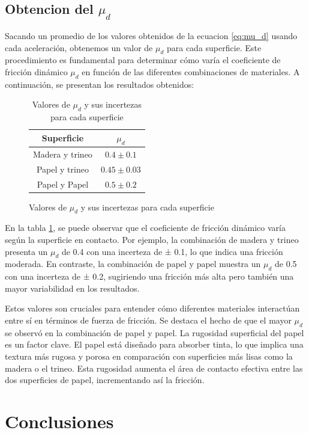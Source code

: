 \documentclass[12pt,a4]{article}
\begin{document}
\subsection{Obtencion del $\mu_d$}

Sacando un promedio de los valores obtenidos de la ecuacion \ref{eq:mu_d} usando cada aceleración, obtenemos un valor de $\mu_d$ para cada superficie. Este procedimiento es fundamental para determinar cómo varía el coeficiente de fricción dinámico $\mu_d$ en función de las diferentes combinaciones de materiales. A continuación, se presentan los resultados obtenidos:
\begin{figure}[H]
    \begin{table}[H]
        \centering
        \begin{tabular}{|c|c|}
            \hline
            \textbf{Superficie} & \textbf{$\mu_d$}\\
            \hline
            Madera y trineo & $0.4 \pm 0.1$\\
            Papel y trineo & $0.45 \pm 0.03$ \\
            Papel y Papel & $0.5 \pm 0.2$ \\
            \hline
        \end{tabular}
        \caption{Valores de $\mu_d$ y sus incertezas para cada superficie}
        \label{tab:mu_d}
    \end{table}
\end{figure}

En la tabla \ref{tab:mu_d}, se puede observar que el coeficiente de fricción dinámico varía según la superficie en contacto. Por ejemplo, la combinación de madera y trineo presenta un $\mu_d$ de 0.4 con una incerteza de ± 0.1, lo que indica una fricción moderada. En contraste, la combinación de papel y papel muestra un $\mu_d$ de 0.5 con una incerteza de ± 0.2, sugiriendo una fricción más alta pero también una mayor variabilidad en los resultados.

Estos valores son cruciales para entender cómo diferentes materiales interactúan entre sí en términos de fuerza de fricción. Se destaca el hecho de que el mayor $\mu_d$ se observó en la combinación de papel y papel. La rugosidad superficial del papel es un factor clave. El papel está diseñado para absorber tinta, lo que implica una textura más rugosa y porosa en comparación con superficies más lisas como la madera o el trineo. Esta rugosidad aumenta el área de contacto efectiva entre las dos superficies de papel, incrementando así la fricción.
\section{Conclusiones}
\end{document}
